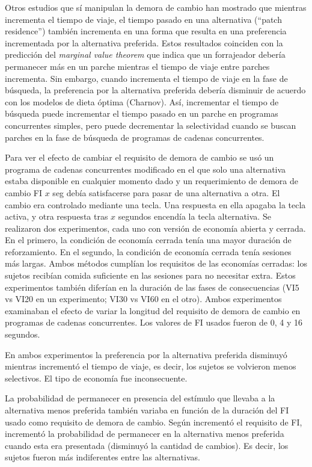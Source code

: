 \documentclass[a4paper,12pt]{article}
\begin{document}
Otros estudios que sí manipulan la demora de cambio han mostrado que mientras incrementa el tiempo de viaje, el tiempo pasado en una alternativa (``patch residence'') también incrementa en una forma que resulta en una preferencia incrementada por la alternativa preferida. Estos resultados coinciden con la predicción del {\itshape marginal value theorem} que indica que un forrajeador debería permanecer más en un parche mientras el tiempo de viaje entre parches incrementa. Sin embargo, cuando incrementa el tiempo de viaje en la fase de búsqueda, la preferencia por la alternativa preferida debería disminuir de acuerdo con los modelos de dieta óptima (Charnov). Así, incrementar el tiempo de búsqueda puede incrementar el tiempo pasado en un parche en programas concurrentes simples, pero puede decrementar la selectividad cuando se buscan parches en la fase de búsqueda de programas de cadenas concurrentes.

Para ver el efecto de cambiar el requisito de demora de cambio se usó un programa de cadenas concurrentes modificado en el que solo una alternativa estaba disponible en cualquier momento dado y un requerimiento de demora de cambio FI $x$ seg debía satisfacerse para pasar de una alternativa a otra. El cambio era controlado mediante una tecla. Una respuesta en ella apagaba la tecla activa, y otra respuesta tras $x$ segundos encendía la tecla alternativa. Se realizaron dos experimentos, cada uno con versión de economía abierta y cerrada. En el primero, la condición de economía cerrada tenía una mayor duración de reforzamiento. En el segundo, la condición de economía cerrada tenía sesiones más largas. Ambos métodos cumplían los requisitos de las economías cerradas: los sujetos recibían comida suficiente en las sesiones para no necesitar extra. Estos experimentos también diferían en la duración de las fases de consecuencias (VI5 vs VI20 en un experimento; VI30 vs VI60 en el otro). Ambos experimentos examinaban el efecto de variar la longitud del requisito de demora de cambio en programas de cadenas concurrentes. Los valores de FI usados fueron de 0, 4 y 16 segundos.

En ambos experimentos la preferencia por la alternativa preferida disminuyó mientras incrementó el tiempo de viaje, es decir, los sujetos se volvieron menos selectivos. El tipo de economía fue inconsecuente.

La probabilidad de permanecer en presencia del estímulo que llevaba a la alternativa menos preferida también variaba en función de la duración del FI usado como requisito de demora de cambio. Según incrementó el requisito de FI, incrementó la probabilidad de permanecer en la alternativa menos preferida cuando esta era presentada (disminuyó la cantidad de cambios). Es decir, los sujetos fueron más indiferentes entre las alternativas. 
\end{document}
